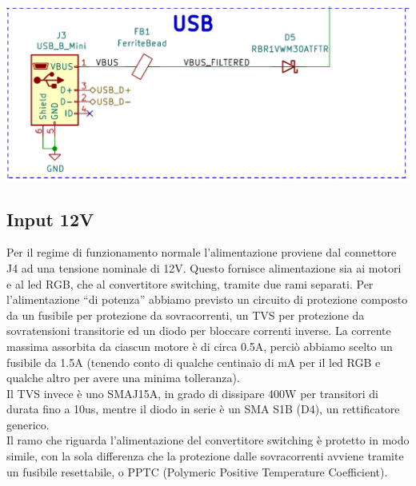 \begin{center}
\includegraphics[scale=0.4]{figures/image60.png}
\captionsetup{type=figure}
\end{center}

\hypertarget{input-12V}{%
\subsection{\texorpdfstring{Input 12V}{Input 12V}}\label{input-12V}}

Per il regime di funzionamento normale l’alimentazione proviene dal connettore J4 ad una tensione nominale di 12V. 
Questo fornisce alimentazione sia ai motori e al led RGB, che al convertitore switching, tramite due rami separati.
Per l’alimentazione “di potenza” abbiamo previsto un circuito di protezione composto da un fusibile per protezione da sovracorrenti, 
un TVS per protezione da sovratensioni transitorie ed un diodo per bloccare correnti inverse. La corrente massima assorbita da 
ciascun motore è di circa 0.5A, perciò abbiamo scelto un fusibile da 1.5A (tenendo conto di qualche centinaio di mA per il led RGB 
e qualche altro per avere una minima tolleranza).\\
Il TVS invece è uno SMAJ15A, in grado di dissipare 400W per transitori di durata fino a 10us, mentre il diodo in serie è un SMA S1B 
(D4), un rettificatore generico.\\
Il ramo che riguarda l’alimentazione del convertitore switching è protetto in modo simile, con la sola differenza che la protezione 
dalle sovracorrenti avviene tramite un fusibile resettabile, o PPTC (Polymeric Positive Temperature Coefficient).

